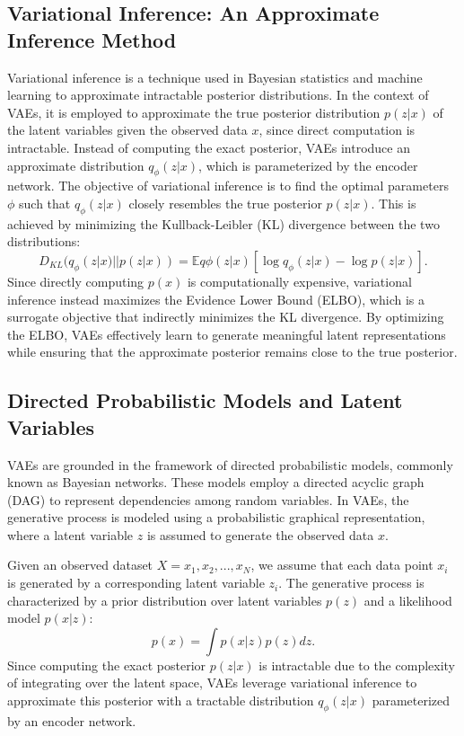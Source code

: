 \subsection{Variational Inference: An Approximate Inference Method}
Variational inference is a technique used in Bayesian statistics and machine learning to approximate intractable posterior distributions. In the context of VAEs, it is employed to approximate the true posterior distribution $p(z|x)$ of the latent variables given the observed data $x$, since direct computation is intractable. Instead of computing the exact posterior, VAEs introduce an approximate distribution $q_\phi(z|x)$, which is parameterized by the encoder network. The objective of variational inference is to find the optimal parameters $\phi$ such that $q_\phi(z|x)$ closely resembles the true posterior $p(z|x)$. This is achieved by minimizing the Kullback-Leibler (KL) divergence between the two distributions:
\begin{equation}
D_{KL}(q_\phi(z|x) || p(z|x)) = \mathbb{E}{q\phi(z|x)}[\log q_\phi(z|x) - \log p(z|x)].
\end{equation}
Since directly computing $p(x)$ is computationally expensive, variational inference instead maximizes the Evidence Lower Bound (ELBO), which is a surrogate objective that indirectly minimizes the KL divergence. By optimizing the ELBO, VAEs effectively learn to generate meaningful latent representations while ensuring that the approximate posterior remains close to the true posterior.

\subsection{Directed Probabilistic Models and Latent Variables}

VAEs are grounded in the framework of directed probabilistic models, commonly known as Bayesian networks. These models employ a directed acyclic graph (DAG) to represent dependencies among random variables. In VAEs, the generative process is modeled using a probabilistic graphical representation, where a latent variable $z$ is assumed to generate the observed data $x$.

Given an observed dataset $X = {x_1, x_2, ..., x_N}$, we assume that each data point $x_i$ is generated by a corresponding latent variable $z_i$. The generative process is characterized by a prior distribution over latent variables $p(z)$ and a likelihood model $p(x|z)$:
\begin{equation}
p(x) = \int p(x|z) p(z) dz.
\end{equation}
Since computing the exact posterior $p(z|x)$ is intractable due to the complexity of integrating over the latent space, VAEs leverage variational inference to approximate this posterior with a tractable distribution $q_\phi(z|x)$ parameterized by an encoder network.

